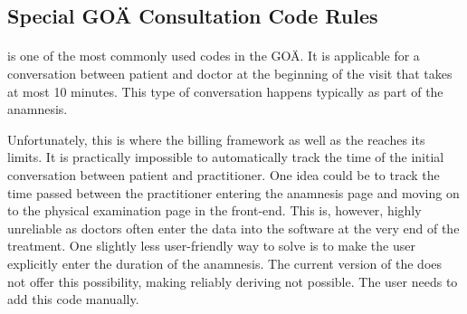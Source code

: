 %


\subsection{Special GOÄ Consultation Code Rules}\label{subsec:special-consultation-code-rules}

\paragraph{}\label{par:goa-1}
 is one of the most commonly used codes in the GOÄ.
It is applicable for a conversation between patient and doctor at the beginning of the visit that takes at most 10 minutes.
This type of conversation happens typically as part of the anamnesis.

Unfortunately, this is where the billing framework as well as the \AVS reaches its limits.
It is practically impossible to automatically track the time of the initial conversation between patient and practitioner.
One idea could be to track the time passed between the practitioner entering the anamnesis page and moving on to the physical examination page in the front-end.
This is, however, highly unreliable as doctors often enter the data into the software at the very end of the treatment.
One slightly less user-friendly way to solve is to make the user explicitly enter the duration of the anamnesis.
The current version of the \AVS does not offer this possibility, making reliably deriving  not possible.
The user needs to add this code manually.

